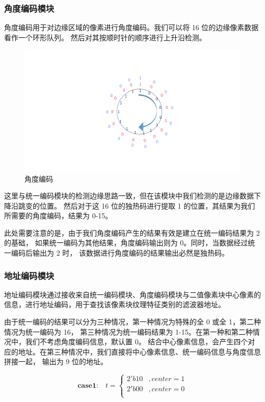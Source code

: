 \documentclass[12pt, a4paper, oneside]{ctexbook}
\begin{document}
	\subsubsection{角度编码模块}
	角度编码用于对边缘区域的像素进行角度编码。我们可以将 16 位的边缘像素数据看作一个环形队列。
	然后对其按顺时针的顺序进行上升沿检测。
	\begin{figure}[h]	
		\centering
		\includegraphics[scale=0.5]{pic/angle.pdf}
		\caption{角度编码}
	\end{figure}
	\par 这里与统一编码模块的检测边缘思路一致，但在该模块中我们检测的是边缘数据下降沿跳变的位置。
	然后对于这 16 位的独热码进行提取 1 的位置，其结果为我们所需要的角度编码，结果为 0-15。
	\par 此处需要注意的是，由于我们角度编码产生的结果有效是建立在统一编码结果为 2 的基础，
	如果统一编码为其他结果，角度编码输出则为 0。同时，当数据经过统一编码后输出为 2 时，
	该数据进行角度编码的结果输出必然是独热码。
	\subsubsection{地址编码模块}
	地址编码模块通过接收来自统一编码模块、角度编码模块与二值像素块中心像素的信息，进行地址编码，用于查找该像素块纹理特征类别的滤波器地址。
	\par 由于统一编码的结果可以分为三种情况，第一种情况为特殊的全 0 或全 1，第二种情况为统一编码为 16，
	第三种情况为统一编码结果为 1-15。在第一种和第二种情况中，我们不考虑角度编码信息，默认置 0。
	结合中心像素信息，会产生四个对应的地址。在第三种情况中，我们直接将中心像素信息、统一编码信息与角度信息拼接一起，
	输出为 9 位的地址。
	
	$$
	\textbf{case1:} \quad t=
	\begin{cases}
		2'b10 &,center = 1 \\
		2'b00 &,center = 0 \\
	\end{cases}
	$$
	
\end{document}
